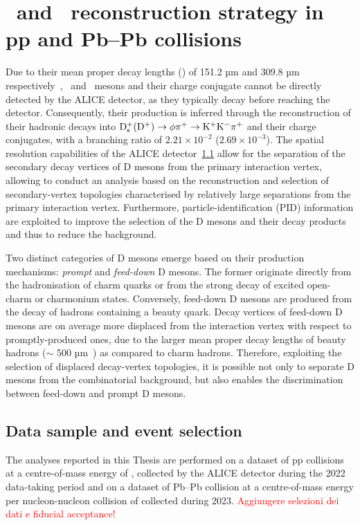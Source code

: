 \chapter{\dpl\ and \ds\ reconstruction strategy in pp and Pb–Pb collisions}

Due to their mean proper decay lengths (\ct) of 151.2 µm and 309.8 µm respectively~\cite{pdg}, \ds\ and \dpl\ mesons and their charge conjugate cannot be directly detected by the ALICE detector, as they typically decay before reaching the detector. Consequently, their production is inferred through the reconstruction of their hadronic decays into $\mathrm{D_s^+} (\mathrm{D^+}) \rightarrow \mathrm{\phi\pi^+ \rightarrow K^+K^-\pi^+}$ and their charge conjugates, with a branching ratio of $2.21\times10^{-2}$ ($2.69\times10^{-3}$). The spatial resolution capabilities of the ALICE detector~\ref{} allow for the separation of the secondary decay vertices of D mesons from the primary interaction vertex, allowing to conduct an analysis based on the reconstruction and selection of secondary-vertex topologies characterised by relatively large separations from the primary interaction vertex. Furthermore, particle-identification (PID) information are exploited to improve the selection of the D mesons and their decay products and thus to reduce the background.

Two distinct categories of D mesons emerge based on their production mechanisms: \emph{prompt} and \emph{feed-down} D mesons. The former originate directly from the hadronisation of charm quarks or from the strong decay of excited open-charm or charmonium states. Conversely, feed-down D mesons are produced from the decay of hadrons containing a beauty quark. Decay vertices of feed-down D mesons are on average more displaced from the interaction vertex with respect to promptly-produced ones, due to the larger mean proper decay lengths of beauty hadrons (\ct $\sim$ 500 µm~\cite{pdg}) as compared to charm hadrons. Therefore, exploiting the selection of displaced decay-vertex topologies, it is possible not only to separate D mesons from the combinatorial background, but also enables the discrimination between feed-down and prompt D mesons.

\section{Data sample and event selection}
The analyses reported in this Thesis are performed on a dataset of pp collisions at a centre-of-mass energy of \thirteen, collected by the ALICE detector during the 2022 data-taking period and on a dataset of Pb--Pb collision at a centre-of-mass energy per nucleon-nucleon collision of \fivenn collected during 2023. \textcolor{red}{Aggiungere selezioni dei dati e fiducial acceptance!}

